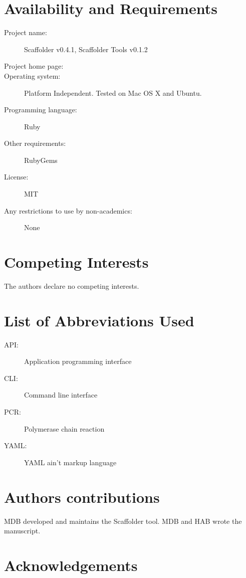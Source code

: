 \documentclass[10pt]{bmc_article}
\newenvironment{bmcformat}{\begin{raggedright}\baselineskip20pt\sloppy\setboolean{publ}{false}}{\end{raggedright}\baselineskip20pt\sloppy}
\begin{document}
\begin{bmcformat}
\clearpage

\section*{Availability and Requirements} %

  \begin{description}
    \item[Project name:] Scaffolder v0.4.1, Scaffolder Tools v0.1.2
    \item[Project home page:] \scaffolder
    \item[Operating system:] Platform Independent. Tested on Mac OS X and
    Ubuntu.
    \item[Programming language:] Ruby
    \item[Other requirements:] RubyGems
    \item[License:] MIT
    \item[Any restrictions to use by non-academics:] None
  \end{description}

\clearpage

\section*{Competing Interests} %

The authors declare no competing interests.

\section*{List of Abbreviations Used} %

  \begin{description}
    \item[API:] Application programming interface
    \item[CLI:] Command line interface
    \item[PCR:] Polymerase chain reaction
    \item[YAML:] YAML ain't markup language\cite{yaml}
  \end{description}

\section*{Authors contributions} %

MDB developed and maintains the Scaffolder tool. MDB and HAB wrote the
manuscript.

\section*{Acknowledgements} %


\end{bmcformat}
\end{document}
